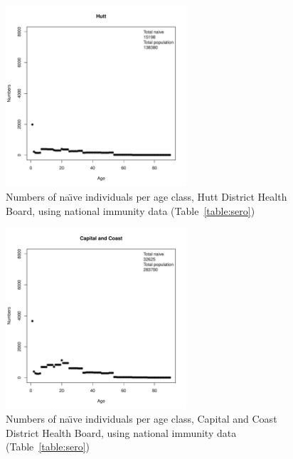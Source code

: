 \documentclass{article}
\begin{document}
\begin{itemize}
\begin{figure}[H]
     \begin{center}
     \includegraphics[width=0.6\textwidth]{dhb13.pdf}
     \end{center}
     \caption{Numbers of na\"{\i}ve individuals per age class, Hutt District Health Board, using national immunity data (Table~\ref{table:sero})}
     \label{fig:Hutt}
\end{figure}

\begin{figure}[H]
     \begin{center}
     \includegraphics[width=0.6\textwidth]{dhb14.pdf}
     \end{center}
     \caption{Numbers of na\"{\i}ve individuals per age class, Capital and Coast District Health Board, using national immunity data (Table~\ref{table:sero})}
     \label{fig:CapitalandCoast}
\end{figure}


\end{itemize}
\end{document}
